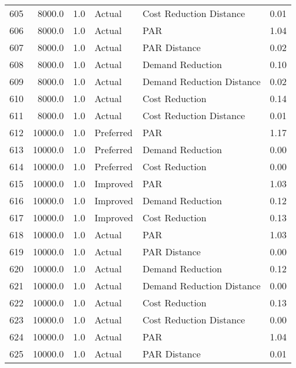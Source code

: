 \begin{longtable}{lrrllr}
605  &       8000.0 &     1.0 &         Actual &    Cost Reduction Distance &   0.01 \\
606  &       8000.0 &     1.0 &         Actual &                        PAR &   1.04 \\
607  &       8000.0 &     1.0 &         Actual &               PAR Distance &   0.02 \\
608  &       8000.0 &     1.0 &         Actual &           Demand Reduction &   0.10 \\
609  &       8000.0 &     1.0 &         Actual &  Demand Reduction Distance &   0.02 \\
610  &       8000.0 &     1.0 &         Actual &             Cost Reduction &   0.14 \\
611  &       8000.0 &     1.0 &         Actual &    Cost Reduction Distance &   0.01 \\
612  &      10000.0 &     1.0 &      Preferred &                        PAR &   1.17 \\
613  &      10000.0 &     1.0 &      Preferred &           Demand Reduction &   0.00 \\
614  &      10000.0 &     1.0 &      Preferred &             Cost Reduction &   0.00 \\
615  &      10000.0 &     1.0 &       Improved &                        PAR &   1.03 \\
616  &      10000.0 &     1.0 &       Improved &           Demand Reduction &   0.12 \\
617  &      10000.0 &     1.0 &       Improved &             Cost Reduction &   0.13 \\
618  &      10000.0 &     1.0 &         Actual &                        PAR &   1.03 \\
619  &      10000.0 &     1.0 &         Actual &               PAR Distance &   0.00 \\
620  &      10000.0 &     1.0 &         Actual &           Demand Reduction &   0.12 \\
621  &      10000.0 &     1.0 &         Actual &  Demand Reduction Distance &   0.00 \\
622  &      10000.0 &     1.0 &         Actual &             Cost Reduction &   0.13 \\
623  &      10000.0 &     1.0 &         Actual &    Cost Reduction Distance &   0.00 \\
624  &      10000.0 &     1.0 &         Actual &                        PAR &   1.04 \\
625  &      10000.0 &     1.0 &         Actual &               PAR Distance &   0.01 \\

\end{longtable}
